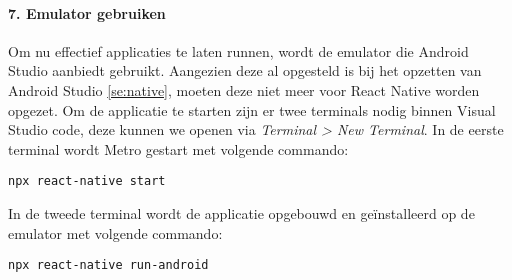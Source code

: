 \paragraph{7. Emulator gebruiken} \label{par:emulatorgebruiken}
Om nu effectief applicaties te laten runnen, wordt de emulator die Android Studio aanbiedt gebruikt. 
Aangezien deze al opgesteld is bij het opzetten van Android Studio \ref{se:native}, 
moeten deze niet meer voor React Native worden opgezet. Om de applicatie te starten zijn er twee terminals nodig 
binnen Visual Studio code, deze kunnen we openen via \textit{Terminal > New Terminal}. 
In de eerste terminal wordt \Gls{Metro} gestart met volgende commando:
\begin{verbatim}
npx react-native start
\end{verbatim}
In de tweede terminal wordt de applicatie opgebouwd en geïnstalleerd op de emulator met volgende commando:
\begin{verbatim}
npx react-native run-android
\end{verbatim}
